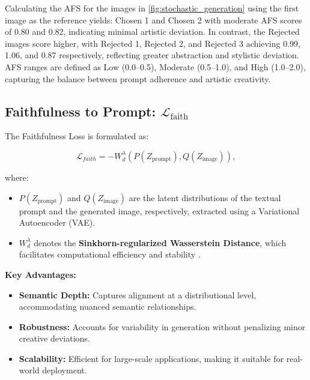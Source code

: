 Calculating the AFS for the images in \cref{fig:stochastic_generation} using the first image as the reference yields: Chosen 1 and Chosen 2 with moderate AFS scores of 0.80 and 0.82, indicating minimal artistic deviation. In contrast, the Rejected images score higher, with Rejected 1, Rejected 2, and Rejected 3 achieving 0.99, 1.06, and 0.87 respectively, reflecting greater abstraction and stylistic deviation. AFS ranges are defined as Low (0.0--0.5), Moderate (0.5--1.0), and High (1.0--2.0), capturing the balance between prompt adherence and artistic creativity.






\subsection{Faithfulness to Prompt: \(\mathcal{L}_{\text{faith}}\)}


The Faithfulness Loss is formulated as:

\[
    \mathcal{L}_{faith} = -W_d^\lambda(P(Z_{\text{prompt}}), Q(Z_{\text{image}})),
\]

where:
\begin{itemize}
    \item $P(Z_{\text{prompt}})$ and $Q(Z_{\text{image}})$ are the latent distributions of the textual prompt and the generated image, respectively, extracted using a Variational Autoencoder (VAE).
    \item $W_d^\lambda$ denotes the \textbf{Sinkhorn-regularized Wasserstein Distance}, which facilitates computational efficiency and stability \cite{cuturi2013sinkhorn}.
\end{itemize}


\textbf{Key Advantages:}
\begin{itemize}
    \item \textbf{Semantic Depth:} Captures alignment at a distributional level, accommodating nuanced semantic relationships.
    \item \textbf{Robustness:} Accounts for variability in generation without penalizing minor creative deviations.
    \item \textbf{Scalability:} Efficient for large-scale applications, making it suitable for real-world deployment.
\end{itemize}

